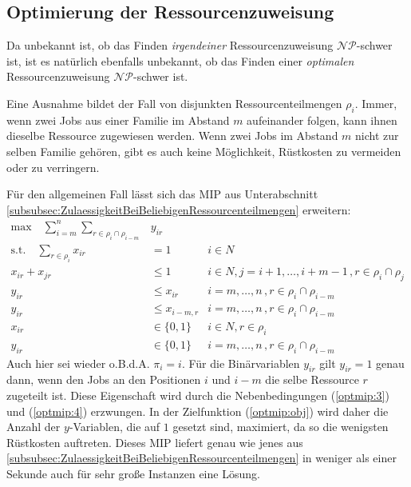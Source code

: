 \documentclass{scrreprt}
\begin{document}
\subsection{Optimierung der Ressourcenzuweisung}
\label{subsec:OptimierungDerRessourcenzuweisung}
Da unbekannt ist, ob das Finden \textit{irgendeiner} Ressourcenzuweisung $\mathcal{NP}$-schwer ist,
ist es natürlich ebenfalls unbekannt, ob das Finden einer \textit{optimalen} Ressourcenzuweisung $\mathcal{NP}$-schwer ist.

Eine Ausnahme bildet der Fall von disjunkten Ressourcenteilmengen $\rho_i$.
Immer, wenn zwei Jobs aus einer Familie im Abstand $m$ aufeinander folgen, kann ihnen dieselbe Ressource zugewiesen werden.
Wenn zwei Jobs im Abstand $m$ nicht zur selben Familie gehören, gibt es auch keine Möglichkeit, Rüstkosten zu vermeiden oder zu verringern.

Für den allgemeinen Fall lässt sich das MIP aus Unterabschnitt \ref{subsubsec:ZulaessigkeitBeiBeliebigenRessourcenteilmengen} erweitern:
\begin{align}
    \text{max} \quad \sum_{i=m}^n\sum_{r\in\rho_i\cap\rho_{i-m}} &y_{ir} \label{optmip:obj} \\
    \text{s.t.}\quad \sum_{r\in\rho_i} x_{ir} &= 1 & i\in N \label{optmip:1} \\
    x_{ir} + x_{jr} &\leq 1 & i\in N, j=i+1,\ldots,i+m-1 \, ,r\in\rho_i\cap\rho_j \label{optmip:2} \\
    y_{ir} &\leq x_{ir} & i=m,\ldots,n \, ,r\in\rho_i\cap\rho_{i-m} \label{optmip:3}\\
    y_{ir} &\leq x_{i-m,r} & i=m,\ldots,n \, ,r\in\rho_i\cap\rho_{i-m} \label{optmip:4}\\
    x_{ir} &\in \{0,1\} & i\in N, r\in\rho_i \\
    y_{ir} &\in \{0,1\} & i=m,\ldots,n \, ,r\in\rho_i\cap\rho_{i-m}
\end{align}
Auch hier sei wieder o.B.d.A. $\pi_i=i$.
Für die Binärvariablen $y_{ir}$ gilt $y_{ir}=1$ genau dann, wenn den Jobs an den Positionen $i$ und $i-m$ die selbe Ressource $r$ zugeteilt ist.
Diese Eigenschaft wird durch die Nebenbedingungen (\ref{optmip:3}) und (\ref{optmip:4}) erzwungen.
In der Zielfunktion (\ref{optmip:obj}) wird daher die Anzahl der $y$-Variablen, die auf $1$ gesetzt sind, maximiert, da so die wenigsten Rüstkosten auftreten.
Dieses MIP liefert genau wie jenes aus \ref{subsubsec:ZulaessigkeitBeiBeliebigenRessourcenteilmengen} in weniger als einer Sekunde auch für sehr große Instanzen eine Lösung.
\end{document}
